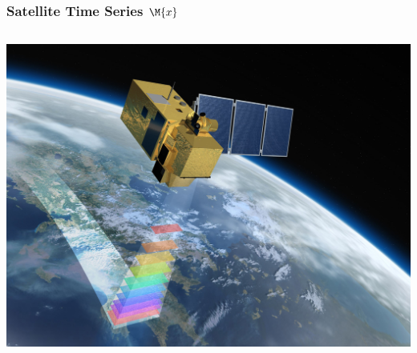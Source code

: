 \documentclass[%
  aspectratio=169,
  9pt,
  USenglish,
  titlegraphic, %
  affiliationintitlepagehead,
  affiliation,
]{beamer}
\begin{document}
\begin{frame}
\frametitle{Satellite Time Series $\M{x}$}

\begin{columns}
	
	
	
	\includegraphics[width=\textwidth]{images/sentinel2}
	
	

\end{columns}
\end{frame}
\end{document}
